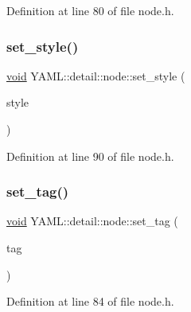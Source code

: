 Definition at line 80 of file node.\+h.

\mbox{\label{class_y_a_m_l_1_1detail_1_1node_acbbc665dea416b11c6e0af9c740f5652}} 
\subsubsection{\texorpdfstring{set\_style()}{set\_style()}}
{\footnotesize\ttfamily \mbox{\hyperlink{glad_8h_a950fc91edb4504f62f1c577bf4727c29}{void}} Y\+A\+M\+L\+::detail\+::node\+::set\+\_\+style (\begin{DoxyParamCaption}\item[{\mbox{\hyperlink{struct_y_a_m_l_1_1_emitter_style_ae86640662c85ce6062a37f9636b6959f}{Emitter\+Style\+::value}}}]{style }\end{DoxyParamCaption})\hspace{0.3cm}{\ttfamily [inline]}}



Definition at line 90 of file node.\+h.

\mbox{\label{class_y_a_m_l_1_1detail_1_1node_abc0892ca6a1ef11225e147c8e9200d37}} 
\subsubsection{\texorpdfstring{set\_tag()}{set\_tag()}}
{\footnotesize\ttfamily \mbox{\hyperlink{glad_8h_a950fc91edb4504f62f1c577bf4727c29}{void}} Y\+A\+M\+L\+::detail\+::node\+::set\+\_\+tag (\begin{DoxyParamCaption}\item[{const \mbox{\hyperlink{glad_8h_ac83513893df92266f79a515488701770}{std\+::string}} \&}]{tag }\end{DoxyParamCaption})\hspace{0.3cm}{\ttfamily [inline]}}



Definition at line 84 of file node.\+h.

\mbox{\label{class_y_a_m_l_1_1detail_1_1node_a7cce9b65d706ae24000e8f8ae33817e2}} 
